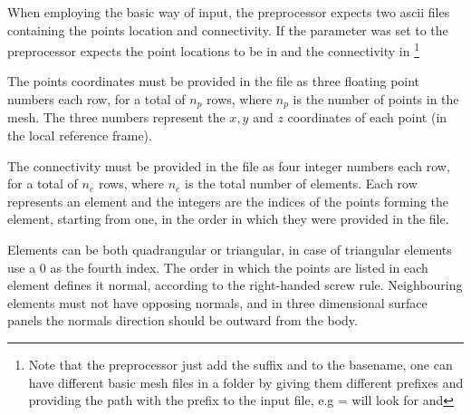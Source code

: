 When employing the basic way of input, the preprocessor expects two ascii files containing the points 
location and connectivity. If the parameter  was set to  the 
preprocessor expects the point locations to be in  and the connectivity 
in  \footnote{Note that the preprocessor just add the suffix  
and  to the basename, one can have different basic mesh files in a folder by giving them 
different prefixes and providing the path with the prefix to the input file, e.g 
 =  will look for  
and }

The points coordinates must be provided in the  file as three floating point numbers 
each row, for a total of $n_p$ rows, where $n_p$ is the number of points in the mesh. The three 
numbers represent the $x, y$ and $z$ coordinates of each point (in the local reference frame).

The connectivity must be provided in the  file as four integer numbers each row, for 
a total of $n_e$ rows, where $n_e$ is the total number of elements. Each row represents an element 
and the integers are the indices of the points forming the element, starting from one, in the order 
in which they were provided in the  file.

Elements can be both quadrangular or triangular, in case of triangular elements use a 0 
as the fourth index. The order in which the points are listed in each element defines it 
normal, according to the right-handed screw rule. Neighbouring elements must not have opposing 
normals, and in three dimensional surface panels the normals direction should be outward from the body. 

